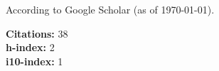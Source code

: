 \newif\ifshowpubsummary
\showpubsummarytrue %

\newif\ifshowsubmittedpubs

\newif\ifshowacceptedpubs

\nocite{*}
\ifshowpubsummary
{}
   \begin{minipage}[t]{0.6\textwidth}
      According to Google Scholar (as of \today).
   \end{minipage}%
   \begin{minipage}[t]{0.4\textwidth}
      \begin{flushright}
         \textbf{Citations:} 38\\
         \textbf{h-index:} 2\\
         \textbf{i10-index:} 1
      \end{flushright}
   \end{minipage}

\else %
\fi

\ifshowsubmittedpubs
\subsectiontitle{Submitted Publications}
\printbibliography[keyword=submitted, heading=none]
\else %
\fi

\ifshowacceptedpubs
\subsectiontitle{Accepted Publications}
\printbibliography[keyword=accepted, heading=none]
\else %
\fi

\printbibliography[keyword=refereed, heading=none]
